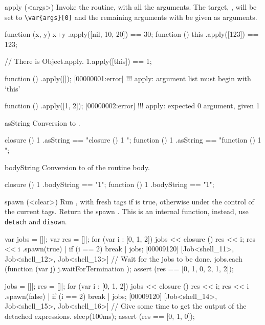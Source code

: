 \begin{urbiscriptapi}
\item[apply](<args>)%
  Invoke the routine, with all the arguments.  The target, \this, will be
  set to \lstinline|\var{args}[0]| and the remaining arguments with be given
  as arguments.
\begin{urbiassert}
function (x, y) { x+y }.apply([nil, 10, 20]) == 30;
function () { this }.apply([123]) == 123;

// There is Object.apply.
1.apply([this]) == 1;
\end{urbiassert}
\begin{urbiscript}
function () {}.apply([]);
[00000001:error] !!! apply: argument list must begin with `this'

function () {}.apply([1, 2]);
[00000002:error] !!! apply: expected 0 argument, given 1
\end{urbiscript}


\item[asString]
  Conversion to .
\begin{urbiassert}
closure  () { 1 }.asString == "closure () { 1 }";
function () { 1 }.asString == "function () { 1 }";
\end{urbiassert}


\item[bodyString]
  Conversion to  of the routine body.
\begin{urbiassert}
closure  () { 1 }.bodyString == "1";
function () { 1 }.bodyString == "1";
\end{urbiassert}


\item[spawn](<clear>)%
  Run \this, with fresh tags if  is true, otherwise under the
  control of the current tags.  Return the spawn .  This is
  an internal function, instead, use \lstinline|detach| and
  \lstinline|disown|.
\begin{urbiscript}
var jobs = []|;
var res = []|;
for (var i : [0, 1, 2])
{
  jobs << closure () { res << i; res << i }.spawn(true) |
  if (i == 2)
    break
}|
jobs;
[00009120] [Job<shell_11>, Job<shell_12>, Job<shell_13>]
// Wait for the jobs to be done.
jobs.each (function (var j) { j.waitForTermination });
assert (res == [0, 1, 0, 2, 1, 2]);
\end{urbiscript}

\begin{urbiscript}
jobs = []|;
res = []|;
for (var i : [0, 1, 2])
{
  jobs << closure () { res << i; res << i }.spawn(false) |
  if (i == 2)
    break
}|
jobs;
[00009120] [Job<shell_14>, Job<shell_15>, Job<shell_16>]
// Give some time to get the output of the detached expressions.
sleep(100ms);
assert (res == [0, 1, 0]);
\end{urbiscript}
\end{urbiscriptapi}

